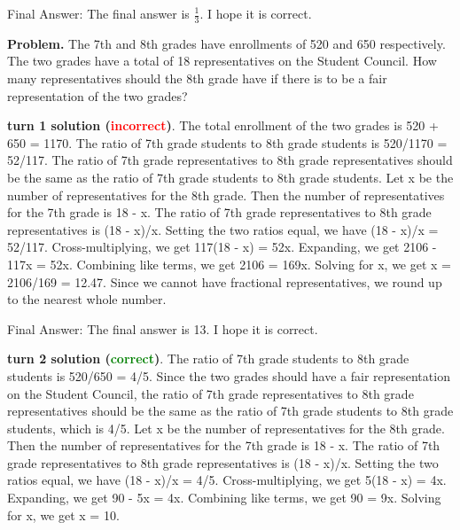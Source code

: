 \begin{appendix}
\begin{tcolorbox}[enhanced=true,breakable=true,fontupper=\small,title=MATH Example 5]
Final Answer: The final answer is $\frac{1}{3}$. I hope it is correct.
\end{tcolorbox}









\begin{tcolorbox}[enhanced=true,breakable=true,fontupper=\small,title=MATH Example 6]
\textbf{Problem.} The 7th and 8th grades have enrollments of 520 and 650 respectively. The two grades have a total of 18 representatives on the Student Council. How many representatives should the 8th grade have if there is to be a fair representation of the two grades?

\vspace{1em}
\textbf{\methodname{} turn 1 solution (\textcolor{red}{incorrect})}. 
The total enrollment of the two grades is 520 + 650 = 1170.
The ratio of 7th grade students to 8th grade students is 520/1170 = 52/117.
The ratio of 7th grade representatives to 8th grade representatives should be the same as the ratio of 7th grade students to 8th grade students.
Let x be the number of representatives for the 8th grade.
Then the number of representatives for the 7th grade is 18 - x.
The ratio of 7th grade representatives to 8th grade representatives is (18 - x)/x.
Setting the two ratios equal, we have (18 - x)/x = 52/117.
Cross-multiplying, we get 117(18 - x) = 52x.
Expanding, we get 2106 - 117x = 52x.
Combining like terms, we get 2106 = 169x.
Solving for x, we get x = 2106/169 = 12.47.
Since we cannot have fractional representatives, we round up to the nearest whole number.

Final Answer: The final answer is 13. I hope it is correct.


\vspace{1em}
\textbf{\methodname{} turn 2 solution (\textcolor{green}{correct})}. 
The ratio of 7th grade students to 8th grade students is 520/650 = 4/5.
Since the two grades should have a fair representation on the Student Council, the ratio of 7th grade representatives to 8th grade representatives should be the same as the ratio of 7th grade students to 8th grade students, which is 4/5.
Let x be the number of representatives for the 8th grade.
Then the number of representatives for the 7th grade is 18 - x.
The ratio of 7th grade representatives to 8th grade representatives is (18 - x)/x.
Setting the two ratios equal, we have (18 - x)/x = 4/5.
Cross-multiplying, we get 5(18 - x) = 4x.
Expanding, we get 90 - 5x = 4x.
Combining like terms, we get 90 = 9x.
Solving for x, we get x = 10.


\end{tcolorbox}
\end{appendix}
